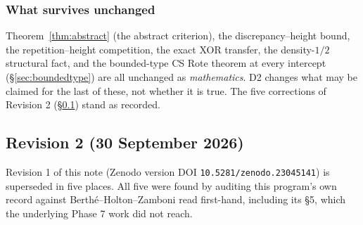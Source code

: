 \documentclass[11pt]{article}
\begin{document}
\subsubsection*{What survives unchanged}

Theorem~\ref{thm:abstract} (the abstract criterion), the discrepancy--height bound, the
repetition--height competition, the exact XOR transfer, the density-$1/2$ structural fact, and the
bounded-type CS Rote theorem at every intercept (\S\ref{sec:boundedtype}) are all unchanged as
\emph{mathematics}. D2 changes what may be claimed for the last of these, not whether it is true.
The five corrections of Revision 2 (\S\ref{sec:rev2}) stand as recorded.

\subsection{Revision 2 (30 September 2026)}
\label{sec:rev2}

Revision 1 of this note (Zenodo version DOI \texttt{10.5281/zenodo.23045141}) is superseded in five
places. All five were found by auditing this program's own record against
Berth\'e--Holton--Zamboni \cite{BHZ2006} read first-hand, including its \S5, which the underlying
Phase 7 work did not reach.
\end{document}
